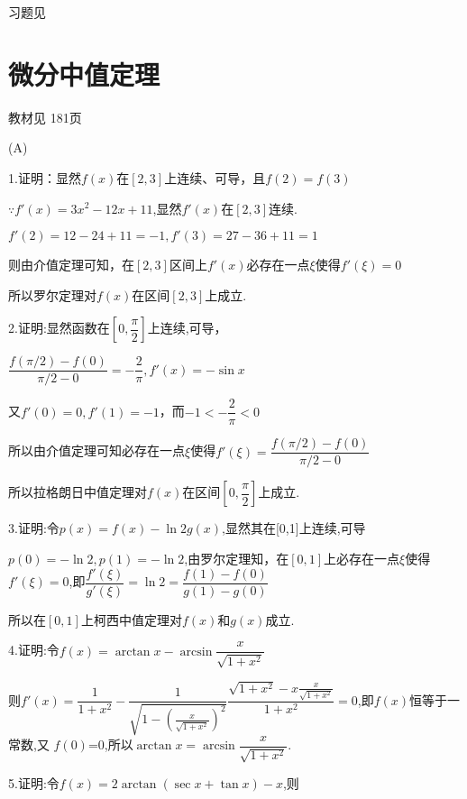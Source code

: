 \begin{flushright}
  \color{zhanqing!80}
   习题见
\end{flushright}

\section{微分中值定理}
\begin{flushright}
  \color{zhanqing!80}
  \color{zhanqing!80}
   教材见 181页 %
\end{flushright}
(A)

1.证明：显然$f(x)$在$[2,3]$上连续、可导，且$f(2)=f(3)$

$\because f'(x) = 3{x^2} - 12x + 11$,显然$f'(x)$在$[2,3]$连续.

$f'(2) = 12 - 24 + 11 =  - 1,f'(3) = 27 - 36 + 11 = 1$

则由介值定理可知，在$[2,3]$区间上$f'(x)$必存在一点$\xi $使得$f'(\xi ) = 0$ 

所以罗尔定理对$f(x)$在区间$[2,3]$上成立.

2.证明:显然函数在$[0,\dfrac{\pi }{2}]$上连续,可导，

$\dfrac{{f(\pi /2) - f(0)}}{{\pi /2 - 0}} =  - \dfrac{2}{\pi },f'(x) =  - \sin x$

又$f'(0) = 0,f'(1) =  - 1$，而$- 1 < - \dfrac{2}{\pi } < 0$

所以由介值定理可知必存在一点$ \xi $使得$f'(\xi ) = \dfrac{{f(\pi /2) - f(0)}}{{\pi /2 - 0}}$

所以拉格朗日中值定理对$f(x)$在区间$[0,\dfrac{\pi }{2}]$上成立.

3.证明:令$p(x) = f(x) - \ln 2g(x)$,显然其在[0,1]上连续,可导

$p(0) =  - \ln 2,p(1) =  - \ln 2$,由罗尔定理知，在$[0,1]$上必存在一点$\xi$使得$f'(\xi ) = 0$,即$\dfrac{{f'(\xi )}}{{g'(\xi )}} = \ln 2 = \dfrac{{f(1) - f(0)}}{{g(1) - g(0)}}$

所以在$[0,1]$上柯西中值定理对$f(x)$和$g(x)$成立.

4.证明:令$f(x) = \arctan x - \arcsin \dfrac{x}{{\sqrt {1 + {x^2}} }}$

则$f'(x) = \dfrac{1}{{1 + {x^2}}} - \dfrac{1}{{\sqrt {1 - {{(\frac{x}{{\sqrt {1 + {x^2}} }})}^2}} }}\dfrac{{\sqrt {1 + {x^2}}  - x\frac{x}{{\sqrt {1 + {x^2}} }}}}{{1 + {x^2}}} = 0$,即$f(x)$恒等于一常数,又
$f(0)$=0,所以$\arctan x = \arcsin \dfrac{x}{{\sqrt {1 + {x^2}} }}$.

5.证明:令$f(x) = 2\arctan (\sec x + \tan x) - x$,则

